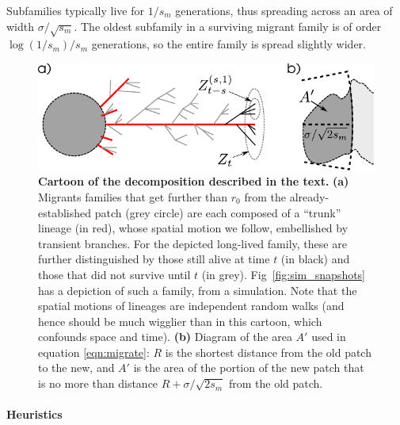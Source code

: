 \documentclass[10pt,letterpaper]{article}
\renewcommand{\P}{\mathbb{P}}
\begin{document}
Subfamilies typically live for $1/s_m$ generations,
thus spreading across an area of width $\sigma/\sqrt{s_m}$.
The oldest subfamily in a surviving migrant family 
is of order $\log(1/s_m)/s_m$ generations,
so the entire family is spread slightly wider.

\begin{figure}[ht!!]
  \begin{center}
    \includegraphics{branching-concept}
  \end{center}
  \caption{
      \textbf{Cartoon of the decomposition described in the text.}
      \textbf{(a)} 
    Migrants families that get further than $r_0$ from the already-established patch (grey circle)
    are each composed of a ``trunk'' lineage (in red), whose spatial motion we follow,
    embellished by transient branches.
    For the depicted long-lived family, these are further distinguished by those still alive at time $t$ (in black)
    and those that did not survive until $t$ (in grey).
    Fig~\ref{fig:sim_snapshots} has a depiction of such a family, from a simulation. 
    Note that the spatial motions of lineages are independent random walks
    (and hence should be much wigglier than in this cartoon, which confounds space and time).
      \textbf{(b)} 
      Diagram of the area $A'$ used in equation \eqref{eqn:migrate}:
      $R$ is the shortest distance from the old patch to the new,
      and $A'$ is the area of the portion of the new patch that is no more than distance $R+\sigma/\sqrt{2s_m}$
      from the old patch.
} \label{fig:branching_decomp}
\end{figure}


\paragraph{Heuristics}
\label{ss:heuristics}
\end{document}
